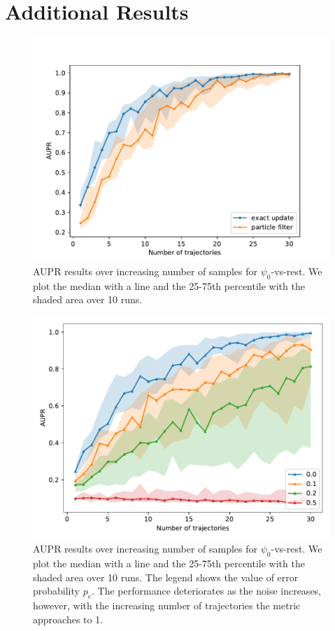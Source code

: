 \chapter{Additional Results}
\begin{figure}[H]
	\begin{center}
		\includegraphics[width=.75\textwidth]{figures/roc_analysis/AUPR_perc_0}
		\caption[AUPR results over increasing number of samples]{AUPR results over increasing number of samples for $ \psi_0 $-vs-rest. We plot the median with a line and the 25-75th percentile with the shaded area over 10 runs.}
		\label{fig:AUPR_class0}
	\end{center}
\end{figure}
\begin{figure}[H]
	\begin{center}
		\includegraphics[width=.75\textwidth]{figures/roc_analysis/error_AUPR_perc_0}
		\caption[AUPR results over increasing number of samples with different error probability $ p_e $]{AUPR results over increasing number of samples for $ \psi_0 $-vs-rest. We plot the median with a line and the 25-75th percentile with the shaded area over 10 runs. The legend shows the value of error probability $ p_e $. The performance deteriorates as the noise increases, however, with the increasing number of trajectories the metric approaches to 1.}
		\label{fig:AUPR_class0_error}
	\end{center}
\end{figure}

